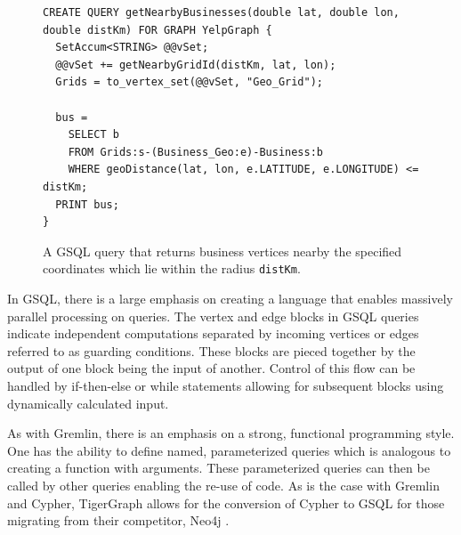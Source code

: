
\begin{figure}[h]
    \centering
    \begin{verbatim}
CREATE QUERY getNearbyBusinesses(double lat, double lon, double distKm) FOR GRAPH YelpGraph {
  SetAccum<STRING> @@vSet;
  @@vSet += getNearbyGridId(distKm, lat, lon);
  Grids = to_vertex_set(@@vSet, "Geo_Grid");
	
  bus =
    SELECT b
    FROM Grids:s-(Business_Geo:e)-Business:b 
    WHERE geoDistance(lat, lon, e.LATITUDE, e.LONGITUDE) <= distKm;
  PRINT bus;
}
    \end{verbatim}
    \caption{A GSQL query that returns business vertices nearby the specified coordinates which lie within the radius \texttt{distKm}.}
    \label{lst:gsql-accum}
\end{figure}


In GSQL, there is a large emphasis on creating a language that enables massively parallel processing on queries. The vertex and edge blocks in GSQL queries indicate independent computations separated by incoming vertices or edges referred to as guarding conditions. These blocks are pieced together by the output of one block being the input of another. Control of this flow can be handled by if-then-else or while statements allowing for subsequent blocks using dynamically calculated input.

As with Gremlin, there is an emphasis on a strong, functional programming style. One has the ability to define named, parameterized queries which is analogous to creating a function with arguments. These parameterized queries can then be called by other queries enabling the re-use of code. As is the case with Gremlin and Cypher, TigerGraph allows for the conversion of Cypher to GSQL for those migrating from their competitor, Neo4j \cite{tigergraph-infoworld}.

